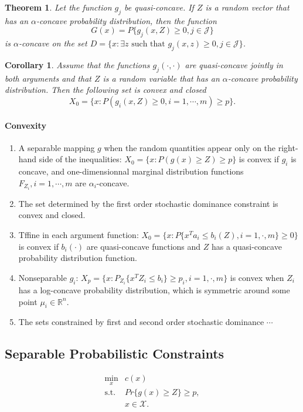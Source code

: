 \documentclass[a4pper,11pt]{article}
\newtheorem{thm}{Theorem}[section]
\newtheorem{corollary}{Corollary}[section]
\begin{document}
\begin{thm}
Let the function $g_j$ be quasi-concave. If $Z$ is a random vector that has an $\alpha$-concave probability distribution, then the function
$$G(x)=P\{g_j(x,Z)\geq 0,j\in \mathcal J\}$$
is $\alpha$-concave on the set $D=\{x :\exists z \text{ such that } g_j(x,z)\geq 0,j\in \mathcal J\}$.
\end{thm}
\begin{corollary} Assume that the functions $g_j(\cdot,\cdot)$ are quasi-concave jointly in both arguments and that $Z$ is a random variable that has an $\alpha$-concave probability distribution. Then the following set is convex and closed
$$X_0=\{x: P(g_i(x,Z) \geq 0, i=1,\cdots,m) \geq p\}.$$ 
\end{corollary}

\paragraph{Convexity}
\begin{enumerate}
\item A separable mapping $g$ when the random quantities appear only on the right-hand side of the inequalities: $X_0=\{x: P(g(x)\geq Z) \geq p\}$ is convex if $g_i$ is concave, and one-dimensionnal marginal distribution functions $F_{Z_i}, i=1,\cdots,m$ are $\alpha_i$-concave.
\item The set determined by the first order stochastic dominance constraint is convex and closed.
\item Tffine in each argument function: $X_0=\{x: P\{x^Ta_i\leq b_i(Z),i=1,\cdot, m\}\geq 0\}$ is convex if $b_i(\cdot)$ are quasi-concave functions and $Z$ has a quasi-concave probability distribution function.
\item Nonseparable $g_i$: $X_p=\{x: P_{Z_i}\{x^TZ_i\leq b_i \}\geq p_i,i=1,\cdot,m\}$ is convex when $Z_i$ has a log-concave probability distribution, which is symmetric around some point $\mu_i\in \mathbb R^n$.
\item The sets constrained by first and second order stochastic dominance $\cdots$
\end{enumerate}

\subsection{Separable Probabilistic Constraints}
\begin{equation}
    \label{4.1}
    \begin{array}{ll}
        \min_x   & c(x) \\
        \text{s.t.} & Pr\{g(x)\geq Z\}\geq p,\\
        & x\in \mathcal X.
    \end{array}
\end{equation}
\end{document}
